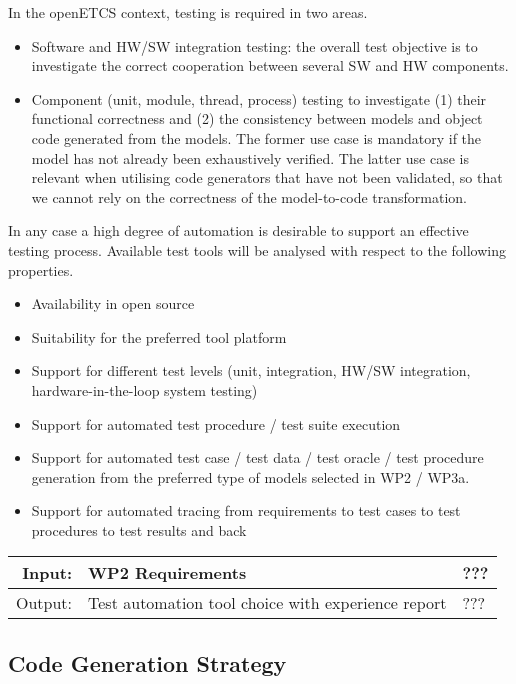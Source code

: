 \documentclass[11pt, a4paper]{article}
\newenvironment{inoutput}
{\vspace{2mm}
\noindent
\begin{tabular}{|r|p{.7\linewidth}|l|}
\hline}
{
\hline
\end{tabular}}
\begin{document}
In the openETCS context, testing is required in two areas.
\begin{itemize}
\item Software and HW/SW integration testing: the overall test objective is to
investigate the correct cooperation between several SW and HW components.
\item Component (unit, module,  thread, process) testing to investigate (1) their functional
correctness 
and (2) the consistency between models and
 object code generated from the models. The former use case is mandatory if the model has not already been exhaustively verified. The latter use case is relevant when utilising code generators 
 that have not been validated, so that we cannot rely on the correctness of the model-to-code transformation.
\end{itemize}
In any case a high degree of automation is desirable to support an effective testing process.
Available test tools will be analysed with respect to the following properties.
\begin{itemize}
\item Availability in open source
\item Suitability for the preferred tool platform 
\item Support for different test levels (unit, integration, HW/SW integration, hardware-in-the-loop system testing)
\item Support for automated test procedure / test suite execution
\item Support for automated test case / test data / test oracle / test procedure generation from
the preferred type of models selected in WP2 / WP3a. 
\item Support for automated tracing from requirements to test cases to test procedures to test results and back
\end{itemize}



\begin{inoutput}
Input: & WP2 Requirements & ??? \\
\hline
Output: & Test automation tool choice with experience report & ??? \\
\end{inoutput}


\subsection{Code Generation Strategy}
\end{document}
